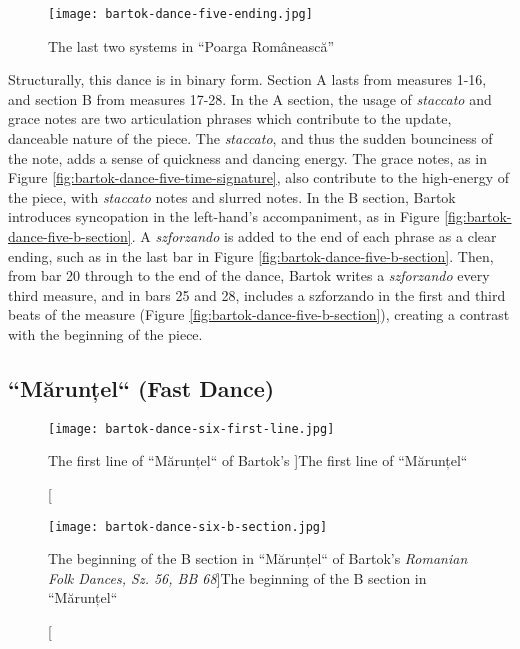 \begin{figure}
  \centering
  \texttt{[image: bartok-dance-five-ending.jpg]}
  \caption[The last two systems in ``Poarga Românească'' of Bartok's \textit{Romanian Folk Dances, Sz. 56, BB 68}]{The last two systems in ``Poarga Românească''}
  \label{fig:bartok-dance-five-ending}
\end{figure}


Structurally, this dance is in binary form. Section A lasts from measures 1-16, and section B from measures 17-28. In the A section, the usage of \textit{staccato} and grace notes are two articulation phrases which contribute to the update, danceable nature of the piece. The \textit{staccato}, and thus the sudden bounciness of the note, adds a sense of quickness and dancing energy. The grace notes, as in Figure \ref{fig:bartok-dance-five-time-signature}\autocite{Lung_2016}, also contribute to the high-energy of the piece, with \textit{staccato} notes and slurred notes. In the B section, Bartok introduces syncopation in the left-hand's accompaniment, as in Figure \ref{fig:bartok-dance-five-b-section}\autocite{Lung_2016}. A \textit{szforzando} is added to the end of each phrase as a clear ending, such as in the last bar in Figure \ref{fig:bartok-dance-five-b-section}\autocite{Lung_2016}. Then, from bar 20 through to the end of the dance, Bartok writes a \textit{szforzando} every third measure, and in bars 25 and 28, includes a szforzando in the first and third beats of the measure (Figure \ref{fig:bartok-dance-five-b-section}\autocite{Lung_2016}), creating a contrast with the beginning of the piece. 

\subsection{``Mărunțel`` (Fast Dance)}

\begin{figure}
  \centering
  \texttt{[image: bartok-dance-six-first-line.jpg]}
  \caption[The first line of ``Mărunțel`` of Bartok's ]{The first line of ``Mărunțel``}
  \label{fig:bartok-dance-six-first-line}
\end{figure}

\begin{figure}
  \centering
  \texttt{[image: bartok-dance-six-b-section.jpg]}
  \caption[The beginning of the B section in ``Mărunțel`` of Bartok's \textit{Romanian Folk Dances, Sz. 56, BB 68}]{The beginning of the B section in ``Mărunțel``}
  \label{fig:bartok-dance-six-b-section}
\end{figure}

